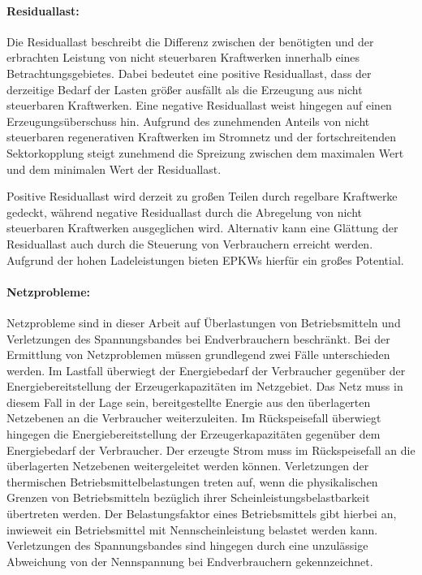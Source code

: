 \paragraph{Residuallast:}

Die Residuallast beschreibt die Differenz zwischen der benötigten und der erbrachten Leistung von nicht steuerbaren Kraftwerken innerhalb eines Betrachtungsgebietes.
Dabei bedeutet eine positive Residuallast, dass der derzeitige Bedarf der Lasten größer ausfällt als die Erzeugung aus nicht steuerbaren Kraftwerken.
Eine negative Residuallast weist hingegen auf einen Erzeugungsüberschuss hin.
Aufgrund des zunehmenden Anteils von nicht steuerbaren regenerativen Kraftwerken im Stromnetz und der fortschreitenden Sektorkopplung steigt zunehmend die Spreizung zwischen dem maximalen Wert und dem minimalen Wert der Residuallast. \cite{Paschotta2020a}\medskip

Positive Residuallast wird derzeit zu großen Teilen durch regelbare Kraftwerke gedeckt, während negative Residuallast durch die Abregelung von nicht steuerbaren Kraftwerken ausgeglichen wird.
Alternativ kann eine Glättung der Residuallast auch durch die Steuerung von Verbrauchern erreicht werden.
Aufgrund der hohen Ladeleistungen bieten \glspl{EPKW} hierfür ein großes Potential. \cite{Paschotta2020a}


\paragraph{Netzprobleme:}

Netzprobleme sind in dieser Arbeit auf Überlastungen von Betriebsmitteln und Verletzungen des Spannungsbandes bei Endverbrauchern beschränkt.
Bei der Ermittlung von Netzproblemen müssen grundlegend zwei Fälle unterschieden werden.
Im Lastfall überwiegt der Energiebedarf der Verbraucher gegenüber der Energiebereitstellung der Erzeugerkapazitäten im Netzgebiet.
Das Netz muss in diesem Fall in der Lage sein, bereitgestellte Energie aus den überlagerten Netzebenen an die Verbraucher weiterzuleiten.
Im Rückspeisefall überwiegt hingegen die Energiebereitstellung der Erzeugerkapazitäten gegenüber dem Energiebedarf der Verbraucher.
Der erzeugte Strom muss im Rückspeisefall an die überlagerten Netzebenen weitergeleitet werden können.
Verletzungen der thermischen Betriebsmittelbelastungen treten auf, wenn die physikalischen Grenzen von Betriebsmitteln bezüglich ihrer Scheinleistungsbelastbarkeit übertreten werden.
Der Belastungsfaktor eines Betriebsmittels gibt hierbei an, inwieweit ein Betriebsmittel mit Nennscheinleistung belastet werden kann.
Verletzungen des Spannungsbandes sind hingegen durch eine unzulässige Abweichung von der Nennspannung bei Endverbrauchern gekennzeichnet. \cite{Agora2019} \cite{Rehtanz2017}


